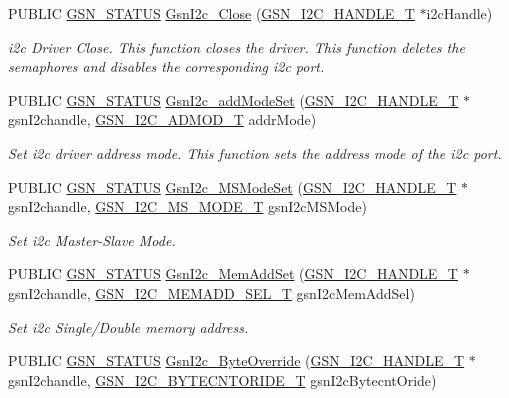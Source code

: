\begin{DoxyCompactItemize}
PUBLIC \hyperlink{a00660_gada5951904ac6110b1fa95e51a9ddc217}{GSN\_\-STATUS} \hyperlink{a00649_gabe1debde978a1d7934b1acfd178469e0}{GsnI2c\_\-Close} (\hyperlink{a00100}{GSN\_\-I2C\_\-HANDLE\_\-T} $\ast$i2cHandle)
\begin{DoxyCompactList}\small\item\em i2c Driver Close. This function closes the driver. This function deletes the semaphores and disables the corresponding i2c port. \end{DoxyCompactList}\item 
PUBLIC \hyperlink{a00660_gada5951904ac6110b1fa95e51a9ddc217}{GSN\_\-STATUS} \hyperlink{a00649_gaad1c66acad9ae584473a112d4b830c3a}{GsnI2c\_\-addModeSet} (\hyperlink{a00100}{GSN\_\-I2C\_\-HANDLE\_\-T} $\ast$gsnI2chandle, \hyperlink{a00649_gac3021fdaf2e11a7972d53d5292ad5f26}{GSN\_\-I2C\_\-ADMOD\_\-T} addrMode)
\begin{DoxyCompactList}\small\item\em Set i2c driver address mode. This function sets the address mode of the i2c port. \end{DoxyCompactList}\item 
PUBLIC \hyperlink{a00660_gada5951904ac6110b1fa95e51a9ddc217}{GSN\_\-STATUS} \hyperlink{a00649_ga0f151cd2545fe37d9dbeccdb49b321cd}{GsnI2c\_\-MSModeSet} (\hyperlink{a00100}{GSN\_\-I2C\_\-HANDLE\_\-T} $\ast$gsnI2chandle, \hyperlink{a00649_ga72605883ea904f4ee6c310a25142a0ab}{GSN\_\-I2C\_\-MS\_\-MODE\_\-T} gsnI2cMSMode)
\begin{DoxyCompactList}\small\item\em Set i2c Master-\/Slave Mode. \end{DoxyCompactList}\item 
PUBLIC \hyperlink{a00660_gada5951904ac6110b1fa95e51a9ddc217}{GSN\_\-STATUS} \hyperlink{a00649_gabc8cac41e125a051c0bcb393f7833dff}{GsnI2c\_\-MemAddSet} (\hyperlink{a00100}{GSN\_\-I2C\_\-HANDLE\_\-T} $\ast$gsnI2chandle, \hyperlink{a00649_ga3c8e92172b940c58950060ddbccee36d}{GSN\_\-I2C\_\-MEMADD\_\-SEL\_\-T} gsnI2cMemAddSel)
\begin{DoxyCompactList}\small\item\em Set i2c Single/Double memory address. \end{DoxyCompactList}\item 
PUBLIC \hyperlink{a00660_gada5951904ac6110b1fa95e51a9ddc217}{GSN\_\-STATUS} \hyperlink{a00516_abe0abc5ae190ee622e1dd9aa212390f1}{GsnI2c\_\-ByteOverride} (\hyperlink{a00100}{GSN\_\-I2C\_\-HANDLE\_\-T} $\ast$gsnI2chandle, \hyperlink{a00649_ga3201b324d6b787d61766a854c7a8702a}{GSN\_\-I2C\_\-BYTECNTORIDE\_\-T} gsnI2cBytecntOride)

\end{DoxyCompactItemize}
